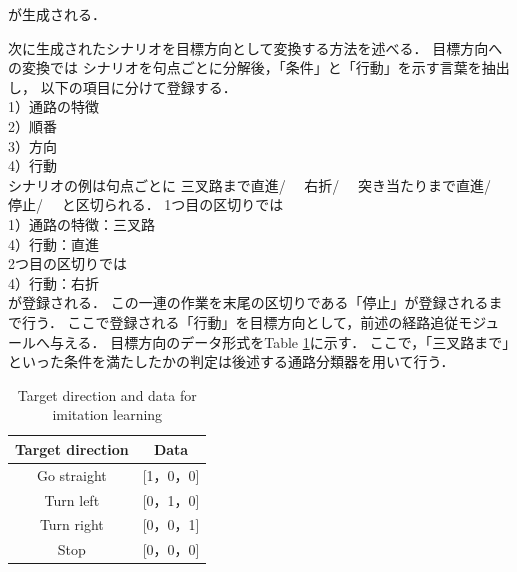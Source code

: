 \documentclass{sice-si}
\begin{document}
が生成される．\par
次に生成されたシナリオを目標方向として変換する方法を述べる．
目標方向への変換では
シナリオを句点ごとに分解後，「条件」と「行動」を示す言葉を抽出し，
以下の項目に分けて登録する．\\
1）通路の特徴\\
2）順番\\
3）方向\\
4）行動\\
シナリオの例は句点ごとに
三叉路まで直進/　
右折/　
突き当たりまで直進/　
停止/　
と区切られる．
1つ目の区切りでは\\
1）通路の特徴：三叉路\\
4）行動：直進\\
2つ目の区切りでは\\
4）行動：右折\\
が登録される．
この一連の作業を末尾の区切りである「停止」が登録されるまで行う．
ここで登録される「行動」を目標方向として，前述の経路追従モジュールへ与える．
目標方向のデータ形式をTable \ref{tab:target}に示す．
ここで，「三叉路まで」といった条件を満たしたかの判定は後述する通路分類器を用いて行う．
\begin{table}[]
    \centering
    \caption{Target direction and data for imitation learning}\label{tab:target}
    \begin{tabular}{|c|c|}
    \hline
    Target direction & Data        \\
    \hline
    Go straight   & {[}1，0，0{]} \\
    Turn left   & {[}0，1，0{]} \\
    Turn right   & {[}0，0，1{]} \\
    Stop   & {[}0，0，0{]}\\
    \hline
    \end{tabular}
    \end{table}

\end{document}
